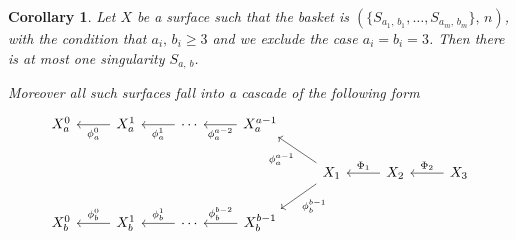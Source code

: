 \documentclass[12pt,a4paper]{book}      %
\newtheorem{cor}[thm]{Corollary}
\theoremstyle{definition}
\begin{document}
\begin{cor}\label{doublecurve}
Let $X$ be a surface such that the basket is  $(\{ S_{a_1, \, b_1}, \dots , S_{a_m, \, b_m} \}, \, n )$, with the condition that $a_i, \, b_i \geq 3$ and we exclude the case $a_i = b_i = 3$. Then there is at most one singularity $S_{a, \, b}$.


Moreover all such surfaces fall into a cascade of the following form
\[
\begin{tikzcd}
X_a^0 & X_a^1 \arrow[l, "\phi_a^0"]  & \cdots \arrow[l, "\phi_a^1"]  & X_a^{a-1}  \arrow[l, "\phi_a^{a-2}"] &                                                           &                        \\
      &                              &                               &                                      & X_1 \arrow[ld, "\phi_b^{b-1}"] \arrow[lu, "\phi_a^{a-1}"] & X_2 \arrow[l, "\Phi_1"'] & X_3 \arrow[l, "\Phi_2"']\\
X_b^0 & X_b^1 \arrow[l, "\phi_b^0"'] & \cdots \arrow[l, "\phi_b^1"'] & X_b^{b-1} \arrow[l, "\phi_b^{b-2}"'] &                                                           &                       
\end{tikzcd}
\]
\end{cor}
\end{document}
